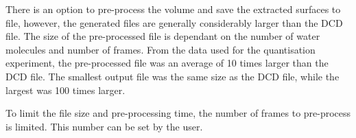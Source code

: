 There is an option to pre-process the volume and save the extracted surfaces to
file, however, the generated files are generally considerably larger than the
DCD file. The size of the pre-processed file is dependant on the number of
water molecules and number of frames. From the data used for the quantisation
experiment, the pre-processed file was an average of 10 times larger than the
DCD file. The smallest output file was the same size as the DCD file, while the
largest was 100 times larger.

To limit the file size and pre-processing time, the number of frames to
pre-process is limited. This number can be set by the user.



